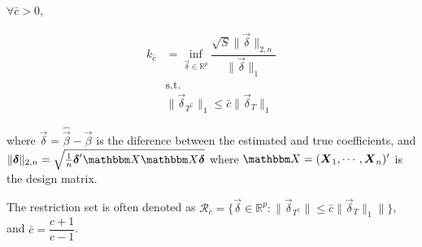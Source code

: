 \begin{Def}
$\forall \bar{c} > 0$,

\begin{align*}
k_{\bar{c}} &= \inf_{\Vec{\delta} \in \mathbb{R}^p}{
    \dfrac{\sqrt{S} \|\Vec{\delta}\|_{2, n}}{\|\Vec{\delta}\|_1}
}\\
&\text{s.t.}\\
&\|\Vec{\delta}_{T^{\complement}}\|_1 \leq \bar{c} \|\Vec{\delta}_T\|_1
\end{align*}

where $\Vec{\delta} = \hat{\Vec{\beta}} - \Vec{\beta}$ is the diference between the estimated and true coefficients, and $\|\Vec{\delta}\|_{2, n} = \sqrt{\frac{1}{n} \Vec{\delta}'\Mat{X}\Mat{X}\Vec{\delta}}$ where $\Mat{X} = (\Vec{X}_1, \cdots, \Vec{X}_n)'$ is the design matrix.

The restriction set is often denoted as $\mathcal{R}_{\bar{c}} = \{\Vec{\delta} \in \mathbb{R}^p: \|\Vec{\delta}_{T^\complement}\| \leq \bar{c} \|\Vec{\delta}_T\|_1\|\}$, and $\bar{c} = \dfrac{c+1}{c-1}$.
\end{Def}
